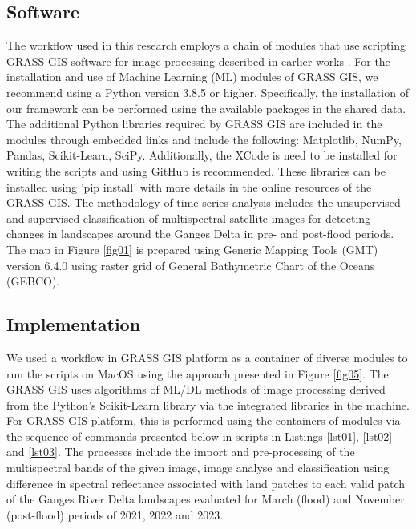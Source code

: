\documentclass[water,article,submit,pdftex,moreauthors]{Definitions/mdpi}
\begin{document}
\subsection{Software}
The workflow used in this research employs a chain of modules that use scripting GRASS GIS software \cite{GRASS_GIS_software} for image processing described in earlier works \cite{Lemenkova202323,technologies11020046}. For the installation and use of Machine Learning (ML) modules of GRASS GIS, we recommend using a Python version 3.8.5 or higher. Specifically, the installation of our framework can be performed using the available packages in the shared data. The additional Python libraries required by GRASS GIS are included in the modules through embedded links and include the following: Matplotlib, NumPy, Pandas, Scikit-Learn, SciPy. Additionally, the XCode is need to be installed for writing the scripts and using GitHub is recommended. These libraries can be installed using 'pip install' with more details in the online resources of the GRASS GIS. The methodology of time series analysis includes the unsupervised and supervised classification of multispectral satellite images for detecting changes in landscapes around the Ganges Delta in pre- and post-flood periods. The map in Figure \ref{fig01} is prepared using Generic Mapping Tools (GMT) version 6.4.0 \cite{Wessel,WesselSmith} using raster grid of General Bathymetric Chart of the Oceans (GEBCO). 

\subsection{Implementation}
We used a workflow in GRASS GIS platform as a container of diverse modules to run the scripts on MacOS using the approach presented in Figure \ref{fig05}. The GRASS GIS uses algorithms of ML/DL methods of image processing derived from the Python's Scikit-Learn library \cite{pedregosa2011scikit} via the integrated libraries in the machine. For GRASS GIS platform, this is performed using the containers of modules via the sequence of commands presented below in scripts in Listings \ref{lst01}, \ref{lst02} and \ref{lst03}. The processes include the import and pre-processing of the multispectral bands of the given image, image analyse and classification using difference in spectral reflectance associated with land patches to each valid patch of the Ganges River Delta landscapes evaluated for March (flood) and November (post-flood) periods of 2021, 2022 and 2023.
\end{document}
